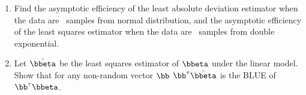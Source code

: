 \begin{enumerate}
\item
Find the asymptotic efficiency of the least absolute deviation estimator
when the data are \iid\ samples from normal distribution, and
the asymptotic efficiency of the least squares estimator
when the data are \iid\ samples from double exponential.

\item
Let $\hat \bbeta$ be the least squares estimator of $\bbeta$ under
the linear model. Show that for any non-random vector $\bb$
$\bb^\tau \hat \bbeta$ is the BLUE of $\bb^\tau \bbeta$.

\end{enumerate}

